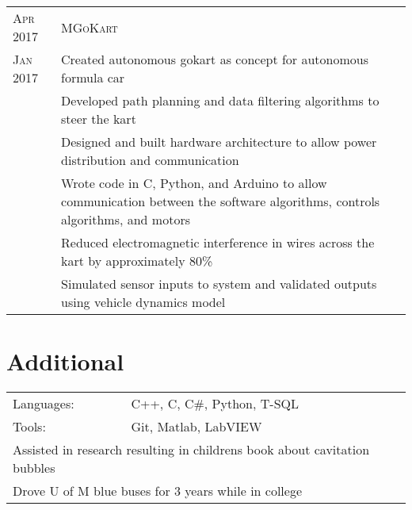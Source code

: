 \documentclass[a4paper,12pt]{article} %
\begin{document}

\begin{tabular}{R{2.1cm}|L{13.0cm}}
\textsc{Apr 2017} & \textsc{MGoKart} \\
\textsc{Jan 2017} & \footnotesize{Created autonomous gokart as concept for
  autonomous formula car} \\
& \footnotesize{Developed path planning and data filtering  algorithms to steer the kart} \\
& \footnotesize{Designed and built hardware architecture to allow power
  distribution and communication} \\
& \footnotesize{Wrote code in C, Python, and Arduino to allow communication
  between the software algorithms, controls algorithms, and motors} \\
& \footnotesize{Reduced electromagnetic interference in wires across the kart by
  approximately 80\%} \\
& \footnotesize{Simulated sensor inputs to system and validated outputs using
  vehicle dynamics model} \\
\end{tabular}


\section{Additional}

\begin{tabular}{ll}
Languages: & C++, C, C\#, Python, T-SQL \\
Tools: & Git, Matlab, LabVIEW \\
\multicolumn{2}{l}{Assisted in research resulting in childrens book about
  cavitation bubbles}\\
\multicolumn{2}{l}{Drove U of M blue buses for 3 years while in college}\\
\end{tabular}

\end{document}
